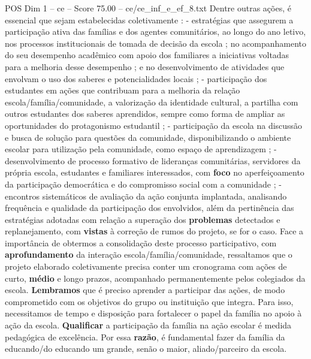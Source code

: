 \begin{textsample}{POS Dim 1 – ce – Score 75.00 – ce/ce\_inf\_e\_ef\_8.txt}
Dentre outras ações, é essencial que sejam estabelecidas coletivamente : - estratégias que assegurem a participação ativa das famílias e dos agentes comunitários, ao longo do ano letivo, nos processos institucionais de tomada de decisão da escola ; no acompanhamento do seu desempenho acadêmico com apoio dos familiares a iniciativas voltadas para a melhoria desse desempenho ; e no desenvolvimento de atividades que envolvam o uso dos saberes e potencialidades locais ; - participação dos estudantes em ações que contribuam para a melhoria da relação escola/família/comunidade, a valorização da identidade cultural, a partilha com outros estudantes dos saberes aprendidos, sempre como forma de ampliar as oportunidades do protagonismo estudantil ; - participação da escola na discussão e busca de solução para questões da comunidade, disponibilizando o ambiente escolar para utilização pela comunidade, como espaço de aprendizagem ; - desenvolvimento de processo formativo de lideranças comunitárias, servidores da própria escola, estudantes e familiares interessados, com \textbf{foco} no aperfeiçoamento da participação democrática e do compromisso social com a comunidade ; - encontros sistemáticos de avaliação da ação conjunta implantada, analisando frequência e qualidade da participação dos envolvidos, além da pertinência das estratégias adotadas com relação a superação dos \textbf{problemas} detectados e replanejamento, com \textbf{vistas} à correção de rumos do projeto, se for o caso.
Face a importância de obtermos a consolidação deste processo participativo, com \textbf{aprofundamento} da interação escola/família/comunidade, ressaltamos que o projeto elaborado coletivamente precisa conter um cronograma com ações de curto, \textbf{médio} e longo prazos, acompanhado permanentemente pelos colegiados da escola. \textbf{Lembramos} que é preciso aprender a participar das ações, de modo comprometido com os objetivos do grupo ou instituição que integra.
Para isso, necessitamos de tempo e disposição para fortalecer o papel da família no apoio à ação da escola. \textbf{Qualificar} a participação da família na ação escolar é medida pedagógica de excelência.
Por essa \textbf{razão}, é fundamental fazer da família da educando/do educando um grande, senão o maior, aliado/parceiro da escola.

\end{textsample}
